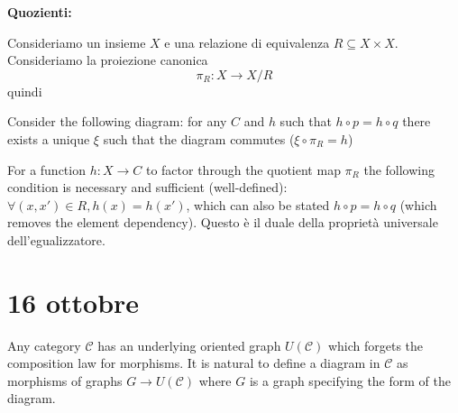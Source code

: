 \documentclass[a4paper]{article}
\begin{document}
\textbf{Quozienti:}

Consideriamo un insieme \(X\) e una relazione di equivalenza \(R \subseteq X \times X\).
Consideriamo la proiezione canonica
\[
    \pi_R \colon X \to X/R
\]
quindi
Consider the following diagram:
for any \(C\) and \(h\) such that \(h\circ p = h \circ q\)
there exists a unique \(\xi\)
such that the diagram commutes (\(\xi \circ \pi_R = h\))
For a function \(h \colon X \to C\) to factor through the quotient map
\(\pi_R\) the following condition is necessary and sufficient (well-defined):
\(\forall(x,x') \in R, h(x) = h(x')\), which can also be stated
\(h \circ p = h \circ q\) (which removes the element dependency).
Questo è il duale della proprietà universale dell'egualizzatore.

\section{16 ottobre}

Any category \(\mathcal{C}\) has an underlying oriented graph \(U(\mathcal{C})\) which
forgets the composition law for morphisms. It is natural to define a diagram in \(\mathcal{C}\)
as morphisms of graphs \(G \to U(\mathcal{C})\) where \(G\) is a graph specifying the form of the diagram.
\end{document}
